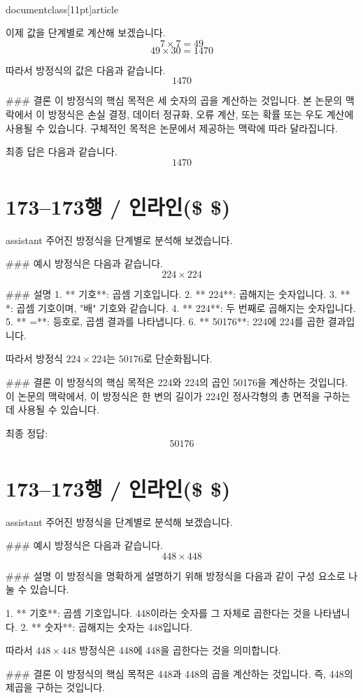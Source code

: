 \\documentclass[11pt]{article}
\begin{document}
이제 값을 단계별로 계산해 보겠습니다.
\[ 7 \times 7 = 49 \]
\[ 49 \times 30 = 1470 \]

따라서 방정식의 값은 다음과 같습니다.
\[ 1470 \]

### 결론
이 방정식의 핵심 목적은 세 숫자의 곱을 계산하는 것입니다. 본 논문의 맥락에서 이 방정식은 손실 결정, 데이터 정규화, 오류 계산, 또는 확률 또는 우도 계산에 사용될 수 있습니다. 구체적인 목적은 논문에서 제공하는 맥락에 따라 달라집니다.

최종 답은 다음과 같습니다.
\[
\boxed{1470}
\]

\section*{173–173행 / 인라인(\$ \$) }
assistant
주어진 방정식을 단계별로 분석해 보겠습니다.

### 예시
방정식은 다음과 같습니다.
\[ 224 \times 224 \]

### 설명
1. ** 기호**: 곱셈 기호입니다.
2. ** 224**: 곱해지는 숫자입니다.
3. ** \times**: 곱셈 기호이며, "배" 기호와 같습니다.
4. ** 224**: 두 번째로 곱해지는 숫자입니다.
5. ** =**: 등호로, 곱셈 결과를 나타냅니다.
6. ** 50176**: 224에 224를 곱한 결과입니다.

따라서 방정식 \( 224 \times 224 \)는 \( 50176 \)로 단순화됩니다.

### 결론
이 방정식의 핵심 목적은 224와 224의 곱인 50176을 계산하는 것입니다. 이 논문의 맥락에서, 이 방정식은 한 변의 길이가 224인 정사각형의 총 면적을 구하는 데 사용될 수 있습니다.

최종 정답:
\[
\boxed{50176}
\]

\section*{173–173행 / 인라인(\$ \$) }
assistant
주어진 방정식을 단계별로 분석해 보겠습니다.

### 예시
방정식은 다음과 같습니다.
\[ 448 \times 448 \]

### 설명
이 방정식을 명확하게 설명하기 위해 방정식을 다음과 같이 구성 요소로 나눌 수 있습니다.

1. ** 기호**: 곱셈 기호입니다. 448이라는 숫자를 그 자체로 곱한다는 것을 나타냅니다.
2. ** 숫자**: 곱해지는 숫자는 448입니다.

따라서 \( 448 \times 448 \) 방정식은 448에 448을 곱한다는 것을 의미합니다.

### 결론
이 방정식의 핵심 목적은 448과 448의 곱을 계산하는 것입니다. 즉, 448의 제곱을 구하는 것입니다.
\end{document}
